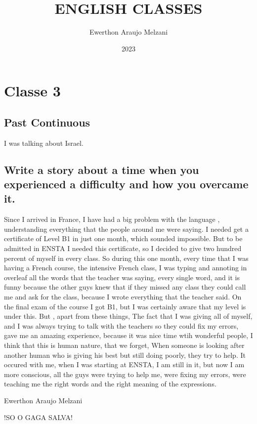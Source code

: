\documentclass{article}
\title{ENGLISH CLASSES}
\author{Ewerthon Araujo Melzani}
\date{2023}
\begin{document}
\maketitle

\section*{Classe 3}

\vspace*{1.5 cm}

\subsection*{Past Continuous}

I was talking about Israel.

\subsection*{Write a story about a time when you experienced a difficulty and how you overcame it.}

Since I arrived in France, I have had a big problem with the language ,
understanding everything that the people around me were saying. I needed get a certificate
of Level B1 in just one month, which sounded impossible. But to be admitted in ENSTA
I needed this certificate, so I decided to give two hundred percent of myself in
every class. So during this one month, every time that I was having a French course, 
the intensive French class, I was typing and annoting in overleaf all 
the words that the teacher was saying, every single word, and it is funny because
the other guys knew that if they missed any class they could call
me and ask for the class, because I wrote everything that the teacher said.
On the final exam of the course I got B1, but I was certainly aware that my level is under 
this. But , apart from these things, The fact that I was giving all of myself, and
I was always trying to talk with the teachers so they could fix my errors, gave
me an amazing experience, because it was nice time wtih wonderful people, I think
that this is human nature, that we forget, When someone is looking after another
human who is giving his best but still doing poorly, they try to help. It occured
with me, when I was starting at ENSTA, I am still in it, but now I am more conscious,
all the guys were trying to help me, were fixing my errors, were teaching me the 
right words and the right meaning of the expressions.


\vspace*{1.5 cm}


\LARGE{Ewerthon Araujo Melzani}

\vspace*{1.5 cm}

\huge{!SO O GAGA SALVA!}
\end{document}
